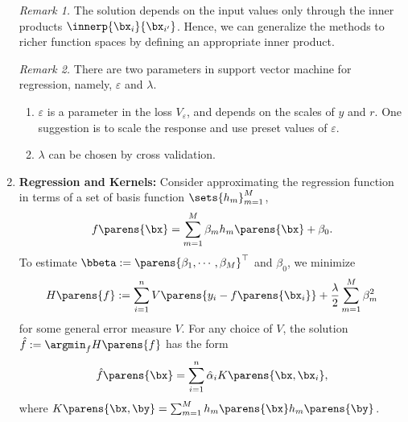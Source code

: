 \documentclass[12pt]{article}
\begin{document}
\begin{enumerate}[label=\textbf{\arabic*.}]

	\textit{Remark 1.} The solution depends on the input values only through the inner products $\innerp{\bx_i}{\bx_{i'}}$. Hence, we can generalize the methods to richer function spaces by defining an appropriate inner product. 
	
	\textit{Remark 2.} There are two parameters in support vector machine for regression, namely, $\varepsilon$ and $\lambda$. 
	\begin{enumerate}
		\item $\varepsilon$ is a parameter in the loss $V_{\varepsilon}$, and depends on the scales of $y$ and $r$. One suggestion is to scale the response and use preset values of $\varepsilon$. 
		\item $\lambda$ can be chosen by cross validation. 
	\end{enumerate}
	
	\item \textbf{Regression and Kernels:} Consider approximating the regression function in terms of a set of basis function $\sets{h_m}_{m=1}^M$, 
	\begin{align*}
		f \parens{\bx} = \sum_{m=1}^M \beta_m h_m \parens{\bx} + \beta_0. 
	\end{align*} 
	To estimate $\bbeta := \parens{\beta_1, \cdots, \beta_M}^\top$ and $\beta_0$, we minimize 
	\begin{align*}
		H \parens{f} := \sum_{i=1}^n V\parens{y_i - f \parens{\bx_i}} + \frac{\lambda}{2} \sum_{m=1}^M \beta_m^2 
	\end{align*}
	for some general error measure $V$. For any choice of $V$, the solution $\hat{f} := \argmin_f H \parens{f}$ has the form 
	\begin{align*}
		\hat{f} \parens{\bx} = \sum_{i=1}^n \hat{\alpha}_i K \parens{\bx, \bx_i}, 
	\end{align*}
	where $K \parens{\bx, \by} = \sum_{m=1}^M h_m \parens{\bx} h_m \parens{\by}$. 
	

\end{enumerate}
\end{document}
